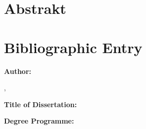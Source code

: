 {  %
  \thispagestyle{plain}
  \section*{Abstrakt}
  \noindent
  \@AbstractCZE
  \vfill
  \clearpage

  \thispagestyle{plain}
  \section*{Bibliographic Entry}
  \noindent
  \begin{minipage}[t]{0.25\textwidth}\vspace{0pt}%
    \doccol \textbf{Author:}
  \end{minipage}
  \hspace{0.05\textwidth}
  \begin{minipage}[t]{0.7\textwidth}\vspace{0pt}%
    \@Author, \par
    \@AuthorAffENG
  \end{minipage} \par
  \vspace{0.5cm}
  \noindent
  \begin{minipage}[t]{0.25\textwidth}\vspace{0pt}%
    \doccol \textbf{Title of Dissertation:}
  \end{minipage}
  \hspace{0.05\textwidth}
  \begin{minipage}[t]{0.7\textwidth}\vspace{0pt}%
    \textbf{\@TitleENG}
  \end{minipage} \par
  \vspace{0.5cm}
  \noindent
  \begin{minipage}[t]{0.25\textwidth}\vspace{0pt}%
    \doccol \textbf{Degree Programme:}
  \end{minipage}
  \hspace{0.05\textwidth}
  \begin{minipage}[t]{0.7\textwidth}\vspace{0pt}%
    \@DegreeProgrammeENG
  \end{minipage} \par
  \vspace{0.5cm}
  \noindent
  \begin{minipage}[t]{0.25\textwidth}\vspace{0pt}%

\end{minipage}}
